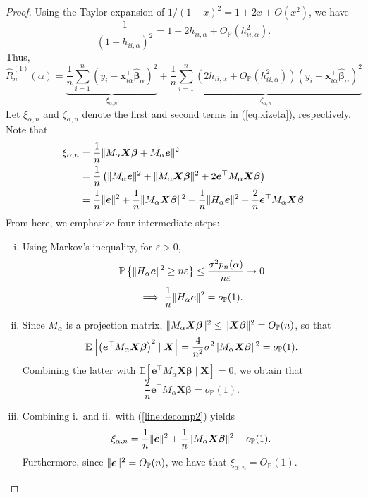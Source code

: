 \documentclass[12pt, letter paper]{article}
\newcommand{\1}{\mathmybb{1}}
\newcommand{\0}{\emptyset}
\newcommand{\prob}{\mathbb{P}}
\newcommand{\Ep}[1]{\mathbb{E}\left[ #1 \right]}
\newcommand{\paren}[1]{\left(#1 \right)}
\newcommand{\set}[1]{\left\{ #1 \right\}}
\newcommand{\norm}[1]{|\hspace{-1pt}|#1 |\hspace{-1pt}|}
\newcommand{\normsq}[1]{\norm{#1}^{2}}
\newcommand{\X}{\boldsymbol{X}}
\newcommand{\x}{\boldsymbol{x}}
\newcommand{\e}{\boldsymbol{e}}
\newcommand{\bbeta}{\boldsymbol{\beta}}
\newcommand{\bbetahat}{\boldsymbol{\hat{\beta}}}
\newcommand{\lev}{h_{ii,\alpha}}
\newcommand{\loocv}[1]{\hat{R}^{(1)}_{n}\paren{#1}}
\newcommand{\op}[1]{o_{\prob}\paren{#1}}
\newcommand{\Op}[1]{O_{\prob}\paren{#1}}
\begin{document}
\begin{proof}
    Using the Taylor expansion of \(1/{(1-x)}^{2} = 1+2x + O(x^{2})\), we have
    \[\frac{1}{\paren{1-\lev}^{2}} = 1 + 2\lev + \Op{\lev^{2}}.\]
    Thus,
    \begin{equation}
        \label{eq:xizeta}
        \loocv{\alpha} = \underbrace{\frac{1}{n}\sum_{i=1}^{n}\paren{y_{i}-\x_{i\alpha}^{\top}\bbetahat_{\alpha}}^{2}}_{\xi_{\alpha,n}} + \underbrace{\frac{1}{n}\sum_{i=1}^{n}\paren{2\lev + \Op{\lev^{2}}}\paren{y_{i}-\x_{i\alpha}^{\top}\bbetahat_{\alpha}}^{2}}_{\zeta_{\alpha,n}}
    \end{equation}
    Let \(\xi_{\alpha,n}\) and \(\zeta_{\alpha,n}\) denote the first and second terms in (\ref{eq:xizeta}), respectively. Note that
    \begin{align}
        \notag\xi_{\alpha,n} &= \frac{1}{n}\normsq{M_{\alpha}\X\bbeta + M_{\alpha}\e}\\
        \label{line:decomp}&= \frac{1}{n}\paren{\normsq{M_{\alpha}\e} + \normsq{M_{\alpha}\X\bbeta} + 2 \e^{\top}M_{\alpha}\X\bbeta}\\
        \label{line:decomp2}&=\frac{1}{n}\normsq{\e} + \frac{1}{n}\normsq{M_{\alpha}\X\bbeta} + \frac{1}{n}\normsq{H_{\alpha}\e} + \frac{2}{n}\e^{\top}M_{\alpha}\X\bbeta
    \end{align}
    From here, we emphasize four intermediate steps:
    \begin{enumerate}[i.]
        \item Using Markov's inequality, for \(\varepsilon>0\), \[\prob\set{\normsq{H_{\alpha}\e}\geq n\varepsilon}\leq \frac{\sigma^{2}p_{n}(\alpha)}{n\varepsilon}\to 0\] 
        \[\implies \frac{1}{n}\normsq{H_{\alpha}\e} = o_{\prob}(1).\]
        \item Since \(M_{\alpha}\) is a projection matrix, \(\normsq{M_{\alpha}\X\bbeta}\leq \normsq{\X\bbeta} = O_{\prob}(n)\), so that \[\Ep{\paren{\e^{\top} M_{\alpha}\X\bbeta}^{2}\mid\X} = \frac{4}{n^{2}}\sigma^{2}\normsq{M_{\alpha}\X\bbeta} = o_{\prob}(1).\] Combining the latter with \(\Ep{\e^{\top} M_{\alpha}\X\bbeta\mid\X} = 0\), we obtain that \[\frac{2}{n}\e^{\top}M_{\alpha}\X\bbeta = o_{\prob}(1).\]
        \item Combining i.\ and ii.\ with (\ref{line:decomp2}) yields \[\xi_{\alpha,n} = \frac{1}{n}\normsq{\e} + \frac{1}{n}\normsq{M_{\alpha}\X\bbeta} + o_{\prob}(1).\] Furthermore, since \(\normsq{\e} = O_{\prob}(n)\), we have that \(\xi_{\alpha,n} = O_{\prob}(1)\).

\end{enumerate}
\end{proof}
\end{document}
